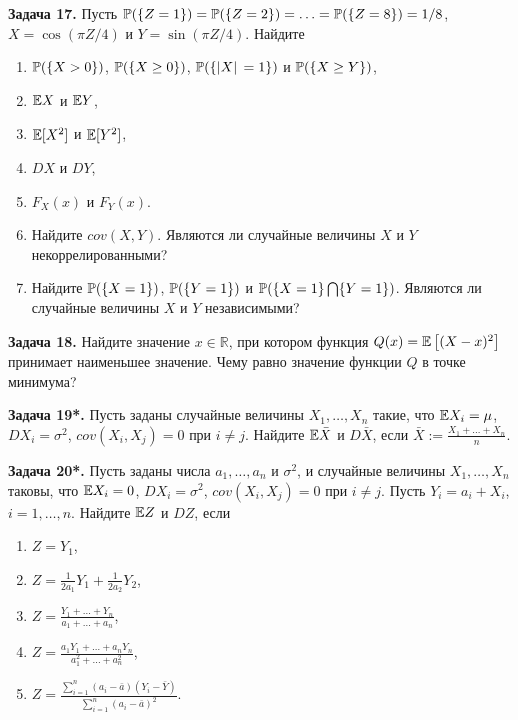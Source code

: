 \textbf{Задача 17.} Пусть ${\rm {\mathbb P}}(\{ Z=1\} )={\rm {\mathbb P}}(\{ Z=2\} )=\ldots ={\rm {\mathbb P}}(\{ Z=8\} )=1/8$, $X=\cos (\pi Z/4)$ и $Y=\sin (\pi Z/4)$. Найдите

\begin{enumerate}
\item  ${\rm {\mathbb P}}(\{ X>0\} )$, ${\rm {\mathbb P}}(\{ X\ge 0\} )$, ${\rm {\mathbb P}}(\{ |X|\, =1\} )$ и ${\rm {\mathbb P}}(\{ X\ge Y\} )$, 

\item  ${\rm {\mathbb E}}X$ и ${\rm {\mathbb E}}Y$,

\item  ${\rm {\mathbb E}}[X^{2} ]$ и ${\rm {\mathbb E}}[Y^{2} ]$,

\item  $DX$ и $DY$,

\item  $F_{X} (x)$ и $F_{Y} (x)$.

\item  Найдите $cov(X,Y)$. Являются ли случайные величины $X$ и $Y$ некоррелированными?

\item  Найдите ${\rm {\mathbb P}}(\{ X=1\} )$, ${\rm {\mathbb P}}(\{ Y=1\} )$ и ${\rm {\mathbb P}}(\{ X=1\} \bigcap \{ Y=1\} )$. Являются ли случайные величины $X$ и $Y$ независимыми?
\end{enumerate}

\textbf{Задача 18.} Найдите значение $x\in {\mathbb R}$, при котором функция $Q(x)={\rm {\mathbb E}}\left[(X-x)^{2} \right]$ принимает наименьшее значение. Чему равно значение функции $Q$ в точке минимума?

\textbf{Задача 19*.} Пусть заданы случайные величины $X_{1} ,\ldots ,X_{n} $ такие, что ${\rm {\mathbb E}}X_{i} =\mu $, $DX_{i} =\sigma ^{2} $, $cov(X_{i} ,X_{j} )=0$ при $i\ne j$. Найдите ${\rm {\mathbb E}}\bar{X}$ и $D\bar{X}$, если $\bar{X}:={\tfrac{X_{1} +\ldots +X_{n} }{n}} $.

\textbf{Задача 20*.} Пусть заданы числа $a_{1} ,\ldots ,a_{n} $ и $\sigma ^{2} $, и случайные величины $X_{1} ,\ldots ,X_{n} $ таковы, что ${\rm {\mathbb E}}X_{i} =0$, $DX_{i} =\sigma ^{2} $, $cov(X_{i} ,X_{j} )=0$ при $i\ne j$. Пусть $Y_{i} =a_{i} +X_{i} $, $i=1,\ldots ,n$. Найдите ${\rm {\mathbb E}}Z$ и $DZ$, если

\begin{enumerate}
\item  $Z=Y_{1} $,

\item  $Z={\tfrac{1}{2a_{1} }} Y_{1} +{\tfrac{1}{2a_{2} }} Y_{2} $,

\item  $Z={\tfrac{Y_{1} +\ldots +Y_{n} }{a_{1} +\ldots +a_{n} }} $,

\item  $Z={\tfrac{a_{1} Y_{1} +\ldots +a_{n} Y_{n} }{a_{1}^{2} +\ldots +a_{n}^{2} }} $,

\item  $Z={\tfrac{\sum _{i=1}^{n}(a_{i} -\bar{a})(Y_{i} -\bar{Y}) }{\sum _{i=1}^{n}(a_{i} -\bar{a})^{2}  }} $.
\end{enumerate}

